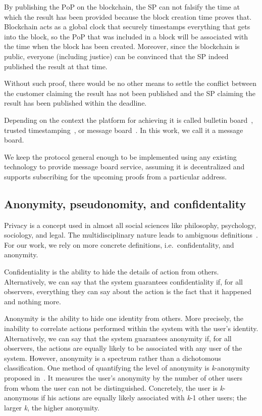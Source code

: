 By publishing the $\mathrm{PoP}$ on the blockchain, the SP can not falsify the time at which the result has been provided because the block creation time proves that. Blockchain acts as a global clock that securely timestamps everything that gets into the block, so the $\mathrm{PoP}$ that was included in a block will be associated with the time when the block has been created. Moreover, since the blockchain is public, everyone (including justice) can be convinced that the SP indeed published the result at that time.

Without such proof, there would be no other means to settle the conflict between the customer claiming the result has not been published and the SP claiming the result has been published within the deadline.

Depending on the context the platform for achieving it is called bulletin board~\cite{achenbachImprovedCoercionresistantElectronic2015}, trusted timestamping~\cite{gippDecentralizedTrustedTimestamping2015}, or message board~\cite{hinarejosSolutionSecureCertified2019}. In this work, we call it a message board.

We keep the protocol general enough to be implemented using any existing technology to provide message board service, assuming it is decentralized and supports subscribing for the upcoming proofs from a particular address.

\subsection{Anonymity, pseudonomity, and confidentality}\label{sec:pseudo-anon}

Privacy is a concept used in almost all social sciences like philosophy, psychology, sociology, and legal. The multidisciplinary nature leads to ambiguous definitions~\cite{smithInformationPrivacyResearch2011}. For our work, we rely on more concrete definitions, i.e.~confidentality, and anonymity.

Confidentiality is the ability to hide the details of action from others. Alternatively, we can say that the system guarantees confidentiality if, for all observers, everything they can say about the action is the fact that it happened and nothing more.

Anonymity is the ability to hide one identity from others. More precisely, the inability to correlate actions performed within the system with the user's identity. Alternatively, we can say that the system guarantees anonymity if, for all observers, the actions are equally likely to be associated with any user of the system. However, anonymity is a spectrum rather than a dichotomous classification. One method of quantifying the level of anonymity is \textit{k}-anonymity proposed in~\cite{sweeneyKanonymityModelProtecting2002}. It measures the user's anonymity by the number of other users from whom the user can not be distinguished. Concretely, the user is \textit{k}-anonymous if his actions are equally likely associated with \textit{k}-1 other users; the larger \textit{k}, the higher anonymity.

